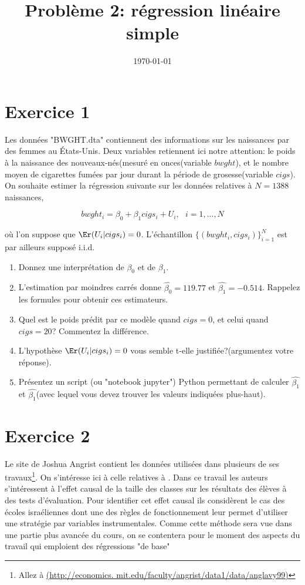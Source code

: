 
\title{Problème 2: régression linéaire simple}
\date{\today}

\maketitle
\section*{Exercice 1}
Les données "BWGHT.dta" contiennent des informations sur les
naissances par des femmes au \'Etats-Unis. Deux variables retiennent
ici notre attention: le poids à la naissance des nouveaux-nés(mesuré
en onces(variable $bwght$), et le nombre moyen de cigarettes
fumées par jour durant la période de grosesse(variable
$cigs$). On souhaite estimer la régression suivante 
sur les données relatives à $N = 1388$ naissances,

\[bwght_i  = \beta_0 + \beta_1 cigs_i + U_i, \ \ \ i = 1, ...,N\]

où l'on suppose que $\Er(U_i| cigs_i) = 0$. L'échantillon $\{(bwght_i,
cigs_i)\}_{i=1}^N$ est par ailleurs supposé i.i.d.

\begin{enumerate}
\item Donnez une interprétation de $\beta_0$ et de $\beta_1$.
\item L'estimation par moindres carrés donne $\hat{\beta_0} = 119.77$
  et $\hat{\beta_1} = -0.514$. Rappelez les formules pour obtenir ces estimateurs.
\item Quel est le poids prédit par ce modèle quand $cigs = 0$, et
  celui quand $cigs = 20$? Commentez la différence.
\item L'hypothèse $\Er(U_i| cigs_i) = 0$ vous semble t-elle
  justifiée?(argumentez votre réponse).
\item Présentez un script (ou "notebook jupyter") Python permettant de
  calculer $\hat{\beta_1}$ et $\hat{\beta_1}$(avec lequel vous devez
  trouver les valeurs indiquées plus-haut).
\end{enumerate}

\section*{Exercice 2}
Le site de Joshua Angrist contient les données utilisées dans
plusieurs de ses travaux\footnote{Allez à
  \url{(http://economics. mit.edu/faculty/angrist/data1/data/anglavy99)}}. On
s'intéresse ici à celle relatives à \cite{angrist1999}. Dans ce
travail les auteurs s'intéressent à l'effet causal de la taille des classes
sur les résultats des élèves à des tests d'évaluation. Pour identifier
cet effet causal ils considèrent le cas des écoles israéliennes dont
une des règles de fonctionnement leur permet d'utiliser une stratégie
par variables instrumentales. Comme cette méthode sera vue dans une
partie plus avancée du cours, on se contentera pour le moment des
aspects du travail qui emploient des régressions "de base"

